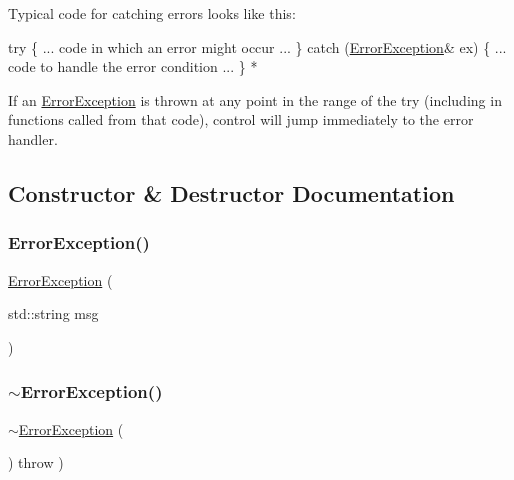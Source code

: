 Typical code for catching errors looks like this\+:


\begin{DoxyPre}
     try \{
        ... code in which an error might occur ...
     \} catch (\mbox{\hyperlink{classErrorException}{ErrorException}}\& ex) \{
        ... code to handle the error condition ...
     \}
*\end{DoxyPre}


If an {\ttfamily \mbox{\hyperlink{classErrorException}{Error\+Exception}}} is thrown at any point in the range of the {\ttfamily try} (including in functions called from that code), control will jump immediately to the error handler. 

\subsection{Constructor \& Destructor Documentation}
\mbox{\label{classErrorException_a4f422b01fff7cc16eea81e00638f44d2}} 
\subsubsection{\texorpdfstring{Error\+Exception()}{ErrorException()}}
{\footnotesize\ttfamily \mbox{\hyperlink{classErrorException}{Error\+Exception}} (\begin{DoxyParamCaption}\item[{std\+::string}]{msg }\end{DoxyParamCaption})}

\mbox{\label{classErrorException_a8a69609bdba32e156392e54dadadcb18}} 
\subsubsection{\texorpdfstring{$\sim$\+Error\+Exception()}{~ErrorException()}}
{\footnotesize\ttfamily $\sim$\mbox{\hyperlink{classErrorException}{Error\+Exception}} (\begin{DoxyParamCaption}{ }\end{DoxyParamCaption}) throw  ) \hspace{0.3cm}{\ttfamily [virtual]}}



